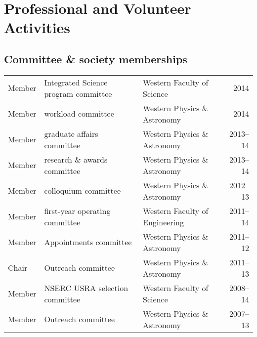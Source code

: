 \documentclass[12pt]{article}
\begin{document}
\section{Professional and Volunteer Activities}

\subsection{Committee \& society memberships}
\begin{tabularx}{\textwidth}{lXXr}
Member& Integrated Science program committee&  Western Faculty of Science& 2014\\
Member& workload committee&  Western Physics \& Astronomy& 2014\\
Member& graduate affairs committee&  Western Physics \& Astronomy& 2013--14\\
Member& research \& awards committee&  Western Physics \& Astronomy& 2013--14\\
Member& colloquium committee& Western Physics \& Astronomy& 2012--13\\
Member& first-year operating committee& Western Faculty of Engineering &  2011--14\\
Member & Appointments committee& Western Physics \& Astronomy& 2011--12\\
Chair& Outreach committee& Western Physics \& Astronomy& 2011--13\\
Member&  NSERC USRA selection committee& Western Faculty of Science& 2008--14\\
Member&  Outreach committee& Western Physics \& Astronomy& 2007--13\\
\end{tabularx}
\end{document}
